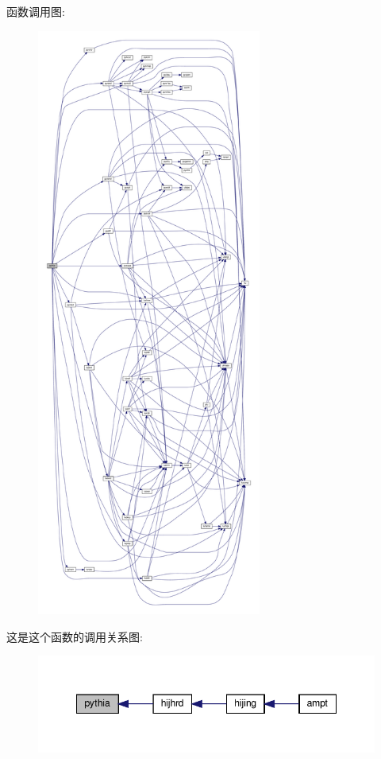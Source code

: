 函数调用图\+:
\nopagebreak
\begin{figure}[H]
\begin{center}
\leavevmode
\includegraphics[height=550pt]{pythia_8f90_a3b4e3111fff758e26d871c35d252acd3_cgraph}
\end{center}
\end{figure}
这是这个函数的调用关系图\+:
\nopagebreak
\begin{figure}[H]
\begin{center}
\leavevmode
\includegraphics[width=348pt]{pythia_8f90_a3b4e3111fff758e26d871c35d252acd3_icgraph}
\end{center}
\end{figure}
